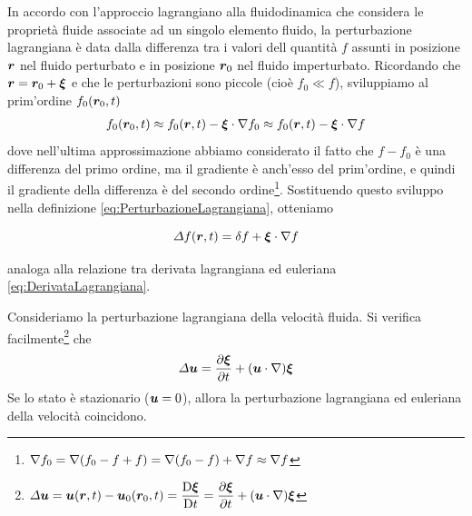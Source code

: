 In accordo con l'approccio lagrangiano alla fluidodinamica che considera le proprietà fluide associate ad un singolo elemento fluido, la perturbazione lagrangiana è data dalla differenza tra i valori dell quantità $f$ assunti in posizione $\V{r}$ nel fluido perturbato e in posizione $\V{r}_0$ nel fluido imperturbato. Ricordando che $\V{r} = \V{r}_0 + \V{\xi}$ e che le perturbazioni sono piccole (cioè $f_0 \ll f$), sviluppiamo al prim'ordine $f_0(\V{r}_0, t)$
\begin{align*}
f_0(\V{r}_0, t) \approx f_0(\V{r}, t) - \scal{\xi}{\nabla}f_0 \approx f_0(\V{r}, t) - \scal{\xi}{\nabla}f
\end{align*}
dove nell'ultima approssimazione abbiamo considerato il fatto che $f-f_0$ è una differenza del primo ordine, ma il gradiente è anch'esso del prim'ordine, e quindi il gradiente della differenza è del secondo ordine\footnote{$\V{\nabla}f_0 = \V{\nabla}(f_0 - f + f) = \V{\nabla}(f_0 - f) + \V{\nabla}f \approx \V{\nabla}f $}.
Sostituendo questo sviluppo nella definizione \ref{eq:PerturbazioneLagrangiana}, otteniamo 
\begin{EQ}
\begin{equation}
\Delta f(\V{r}, t) = \delta f + \scal{\xi}{\nabla}f
\end{equation}
\end{EQ}
analoga alla relazione tra derivata lagrangiana ed euleriana \ref{eq:DerivataLagrangiana}.

Consideriamo la perturbazione lagrangiana della velocità fluida. Si verifica facilmente\footnote{$\Delta \V{u} = \V{u}(\V{r}, t) - \V{u}_0(\V{r}_0, t) = \derL{\V{\xi}}{t} = \derP{\V{\xi}}{t} + (\scal{u}{\nabla})\V{\xi} $} che 
\begin{equation}
\Delta \V{u} = \derP{\V{\xi}}{t} + (\scal{u}{\nabla})\V{\xi} \label{eq:PerturbazioneVelocità}
\end{equation}
Se lo stato è stazionario ($\V{u} =0$), allora la perturbazione lagrangiana ed euleriana della velocità coincidono.

